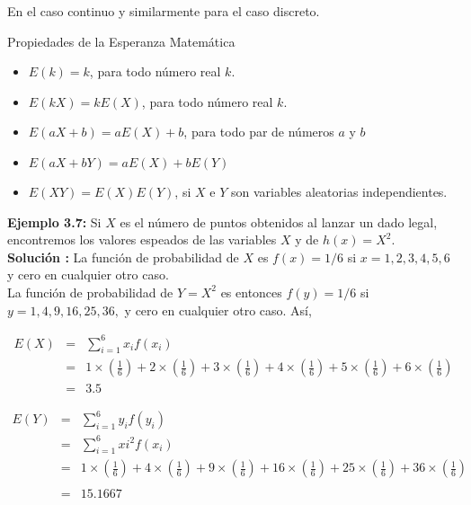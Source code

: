 \documentclass[base=hide,12pt]{elegantbook}
\begin{document}
En el caso continuo y similarmente para el caso discreto.\\

\begin{Box2}{Propiedades de la Esperanza Matemática}
\begin{itemize}
	\item $E(k)=k$, para todo número real $k$.
	\item $E(kX)=kE(X)$, para todo número real $k$.
	\item $E(aX+b)=aE(X)+b$, para todo par de números $a$ y $b$
	\item $E(aX+bY)=aE(X)+bE(Y)$
	\item $E(XY)=E(X)E(Y)$, si $X$ e $Y$ son variables aleatorias independientes.
\end{itemize}
\end{Box2}
%
\textcolor{col3}{\bf Ejemplo 3.7:} Si $X$ es el número de puntos obtenidos al lanzar un dado legal, encontremos los valores espeados de las variables $X$ y  de $h(x)=X^{2}$.\\

\textcolor{col3}{\bf Solución :}
La función de probabilidad de $X$ es $f(x)=1/6$ si $ x=1,2,3,4,5,6$ y cero en cualquier otro caso.\\

La función de probabilidad de $Y=X^{2}$ es entonces $f(y) = 1/6$ si $y=1,4,9,16,25,36,$ y cero en cualquier otro caso.  Así,

\begin{eqnarray*}
	E(X)&=&\sum\limits_{i=1}^{6} x_{i} f(x_{i})\\
	&=&	1 \times \left(\frac{1}{6}\right) + 2 \times \left(\frac{1}{6}\right)  + 3 \times  \left(\frac{1}{6}\right)  + 4 \times \left(\frac{1}{6}\right)  + 5 \times \left(\frac{1}{6}\right)  + 6 \times \left(\frac{1}{6}\right) 	\\
	&=& 3.5
\end{eqnarray*}	

\begin{eqnarray*}
	E(Y)&=&\sum\limits_{i=1}^{6} y_{i} f(y_{i})\\
	&=&\sum\limits_{i=1}^{6} x{i}^{2} f(x_{i})\\
	&=&1 \times \left(\frac{1}{6}\right)+4 \times \left(\frac{1}{6}\right)+ 9 \times \left(\frac{1}{6}\right)+ 16 \times \left(\frac{1}{6}\right)
	+25 \times \left(\frac{1}{6}\right)+36 \times \left(\frac{1}{6}\right)\\
	&&\\
	&=&15.1667
\end{eqnarray*}
\end{document}
